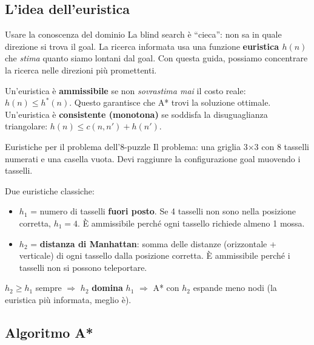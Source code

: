 \documentclass[12pt,a4paper]{article}
\begin{document}
\subsection{L'idea dell'euristica}

\begin{narrativo}{Usare la conoscenza del dominio}
La blind search è ``cieca'': non sa in quale direzione si trova il goal. La ricerca informata usa una funzione \textbf{euristica $h(n)$} che \emph{stima} quanto siamo lontani dal goal. Con questa guida, possiamo concentrare la ricerca nelle direzioni più promettenti.

Un'euristica è \textbf{ammissibile} se non \emph{sovrastima mai} il costo reale: $h(n) \leq h^*(n)$. Questo garantisce che A* trovi la soluzione ottimale. Un'euristica è \textbf{consistente (monotona)} se soddisfa la disuguaglianza triangolare: $h(n) \leq c(n,n') + h(n')$.
\end{narrativo}

\begin{esempio}{Euristiche per il problema dell'8-puzzle}
Il problema: una griglia 3$\times$3 con 8 tasselli numerati e una casella vuota. Devi raggiunre la configurazione goal muovendo i tasselli.

Due euristiche classiche:
\begin{itemize}[noitemsep]
  \item $h_1$ = numero di tasselli \textbf{fuori posto}. Se 4 tasselli non sono nella posizione corretta, $h_1 = 4$. È ammissibile perché ogni tassello richiede almeno 1 mossa.
  \item $h_2$ = \textbf{distanza di Manhattan}: somma delle distanze (orizzontale + verticale) di ogni tassello dalla posizione corretta. È ammissibile perché i tasselli non si possono teleportare.
\end{itemize}
$h_2 \geq h_1$ sempre $\Rightarrow$ $h_2$ \textbf{domina} $h_1$ $\Rightarrow$ A* con $h_2$ espande meno nodi (la euristica più informata, meglio è).
\end{esempio}

\subsection{Algoritmo A*}
\end{document}
